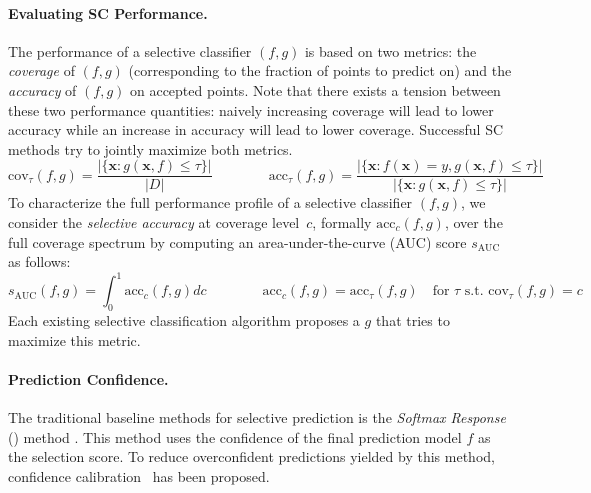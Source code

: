\paragraph{Evaluating SC Performance.} The performance of a selective classifier $(f,g)$ is based on two metrics: the \emph{coverage} of $(f,g)$ (corresponding to the fraction of points to predict on) and the \emph{accuracy} of $(f,g)$ on accepted points. Note that there exists a tension between these two performance quantities: naively increasing coverage will lead to lower accuracy while an increase in accuracy will lead to lower coverage. Successful SC methods try to jointly maximize both metrics.%
    \begin{equation}
    \text{cov}_\tau(f,g) = \frac{|\{\bm{x} : g(\bm{x}, f) \leq \tau \}|}{|D|} \qquad \qquad 
    \text{acc}_\tau(f,g) = \frac{|\{\bm{x} : f(\bm{x}) = y, g(\bm{x}, f) \leq \tau \}|}{|\{\bm{x} : g(\bm{x}, f) \leq \tau \}|}
    \end{equation}
To characterize the full performance profile of a selective classifier $(f,g)$, we consider the \emph{selective accuracy} at coverage level~$c$, formally $\text{acc}_c(f,g)$, over the full coverage spectrum by computing an area-under-the-curve (AUC) score $s_\text{AUC}$ as follows:%
\begin{equation}
\label{eq:sc_perf}
    s_\text{AUC}(f,g) = \int_0^1 \text{acc}_c(f,g)dc \qquad \qquad  \text{acc}_c(f,g) = \text{acc}_\tau(f,g)\quad \text{for $\tau$ s.t. $\text{cov}_\tau(f,g) = c$} 
\end{equation}
Each existing selective classification algorithm proposes a $g$ that tries to maximize this metric. %


\paragraph{Prediction Confidence.} The traditional baseline methods for selective prediction is the \emph{Softmax Response} (\sr) method \citep{hendrycks2016baseline, geifman2017selective}. This method uses the confidence of the final prediction model $f$ as the selection score. To reduce overconfident predictions yielded by this method, confidence calibration~\citep{guo2017calibration} has been proposed.

